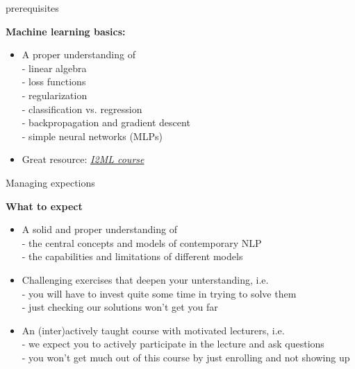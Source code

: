 \documentclass[11pt,compress,t,notes=noshow, xcolor=table]{beamer}
\begin{document}
\begin{frame}{prerequisites}
	
\vfill
	
\textbf{Machine learning basics:}

		\begin{itemize}
				\item A proper understanding of\\
				- linear algebra\\
				- loss functions\\
				- regularization\\
				- classification vs. regression\\
				- backpropagation and gradient descent\\
				- simple neural networks (MLPs)
				\item Great resource: \href{https://slds-lmu.github.io/i2ml/}{\textit{I2ML course}}
		\end{itemize}

\vfill

\end{frame}


\begin{frame}{Managing expections}

\vfill

\textbf{What to expect}

	\begin{itemize}
		\item A solid and proper understanding of\\
		- the central concepts and models of contemporary NLP\\
		- the capabilities and limitations of different models
		\item Challenging exercises that deepen your unterstanding, i.e.\\
		- you will have to invest quite some time in trying to solve them\\
		- just checking our solutions won't get you far
		\item An (inter)actively taught course with motivated lecturers, i.e.\\
		- we expect you to actively participate in the lecture and ask questions\\
		- you won't get much out of this course by just enrolling and not showing up
	\end{itemize}


\vfill

\end{frame}
\end{document}
